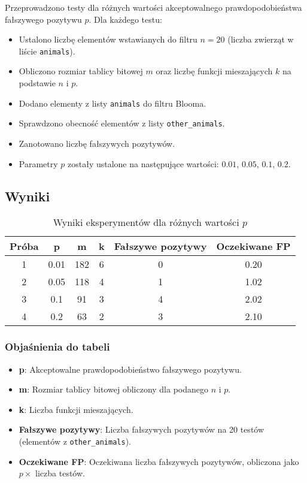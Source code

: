 \documentclass{article}
\begin{document}
Przeprowadzono testy dla różnych wartości akceptowalnego prawdopodobieństwa fałszywego pozytywu $p$. Dla każdego testu:
\begin{itemize}
    \item Ustalono liczbę elementów wstawianych do filtru $n = 20$ (liczba zwierząt w liście \texttt{animals}).
    \item Obliczono rozmiar tablicy bitowej $m$ oraz liczbę funkcji mieszających $k$ na podstawie $n$ i $p$.
    \item Dodano elementy z listy \texttt{animals} do filtru Blooma.
    \item Sprawdzono obecność elementów z listy \texttt{other\_animals}.
    \item Zanotowano liczbę fałszywych pozytywów.
    \item Parametry $p$ zostały ustalone na następujące wartości: $0.01$, $0.05$, $0.1$, $0.2$.

\end{itemize}

\subsection{Wyniki}

\begin{table}[H]
\centering
\begin{tabular}{cccccc}
\toprule
\textbf{Próba} & \textbf{p} & \textbf{m} & \textbf{k} & \textbf{Fałszywe pozytywy} & \textbf{Oczekiwane FP} \\
\midrule
1 & 0.01 & 182 & 6 & 0 & 0.20 \\
2 & 0.05 & 118 & 4 & 1 & 1.02 \\
3 & 0.1 & 91 & 3 & 4 & 2.02 \\
4 & 0.2 & 63 & 2 & 3 & 2.10 \\
\bottomrule
\end{tabular}
\caption{Wyniki eksperymentów dla różnych wartości $p$}
\end{table}

\subsubsection*{Objaśnienia do tabeli}
\begin{itemize}
    \item \textbf{p}: Akceptowalne prawdopodobieństwo fałszywego pozytywu.
    \item \textbf{m}: Rozmiar tablicy bitowej obliczony dla podanego $n$ i $p$.
    \item \textbf{k}: Liczba funkcji mieszających.
    \item \textbf{Fałszywe pozytywy}: Liczba fałszywych pozytywów na 20 testów (elementów z \texttt{other\_animals}).
    \item \textbf{Oczekiwane FP}: Oczekiwana liczba fałszywych pozytywów, obliczona jako $p \times$ liczba testów.
\end{itemize}
\end{document}
